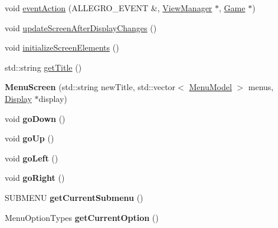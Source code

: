 \begin{DoxyCompactItemize}
\item 
void \hyperlink{classMenuScreen_a88b7f24087e39bc51cfad7fe20d285e8}{event\+Action} (A\+L\+L\+E\+G\+R\+O\+\_\+\+E\+V\+E\+NT \&, \hyperlink{classViewManager}{View\+Manager} $\ast$, \hyperlink{classGame}{Game} $\ast$)
\item 
void \hyperlink{classMenuScreen_a8a96f9e8ec773604623cee9f28981908}{update\+Screen\+After\+Display\+Changes} ()
\item 
void \hyperlink{classMenuScreen_a9b1934fd07f1f4d5e2290cbd99f4c82d}{initialize\+Screen\+Elements} ()
\item 
std\+::string \hyperlink{classMenuScreen_ad4769529fa7e634808dcbe8ceca47537}{get\+Title} ()
\item 
{\bfseries Menu\+Screen} (std\+::string new\+Title, std\+::vector$<$ \hyperlink{classMenuModel}{Menu\+Model} $>$ menus, \hyperlink{classDisplay}{Display} $\ast$display)\hypertarget{classMenuScreen_a324689fac0fdf0ce9254616277cb0ef1}{}\label{classMenuScreen_a324689fac0fdf0ce9254616277cb0ef1}

\item 
void {\bfseries go\+Down} ()\hypertarget{classMenuScreen_a46bd6159e21766fea9a9e7bc0c5337b2}{}\label{classMenuScreen_a46bd6159e21766fea9a9e7bc0c5337b2}

\item 
void {\bfseries go\+Up} ()\hypertarget{classMenuScreen_a703f55fb295f4be1c2a7c2454e552024}{}\label{classMenuScreen_a703f55fb295f4be1c2a7c2454e552024}

\item 
void {\bfseries go\+Left} ()\hypertarget{classMenuScreen_a256f99b989b1c0ba37f289b4013e3bb0}{}\label{classMenuScreen_a256f99b989b1c0ba37f289b4013e3bb0}

\item 
void {\bfseries go\+Right} ()\hypertarget{classMenuScreen_ae353feb99de6f373896e628db8ff4f9a}{}\label{classMenuScreen_ae353feb99de6f373896e628db8ff4f9a}

\item 
S\+U\+B\+M\+E\+NU {\bfseries get\+Current\+Submenu} ()\hypertarget{classMenuScreen_a96ba9d51222d067f8c475f47833bb288}{}\label{classMenuScreen_a96ba9d51222d067f8c475f47833bb288}

\item 
Menu\+Option\+Types {\bfseries get\+Current\+Option} ()\hypertarget{classMenuScreen_aaf52feaf8f10106841287f025b1dd9ff}{}\label{classMenuScreen_aaf52feaf8f10106841287f025b1dd9ff}


\end{DoxyCompactItemize}
